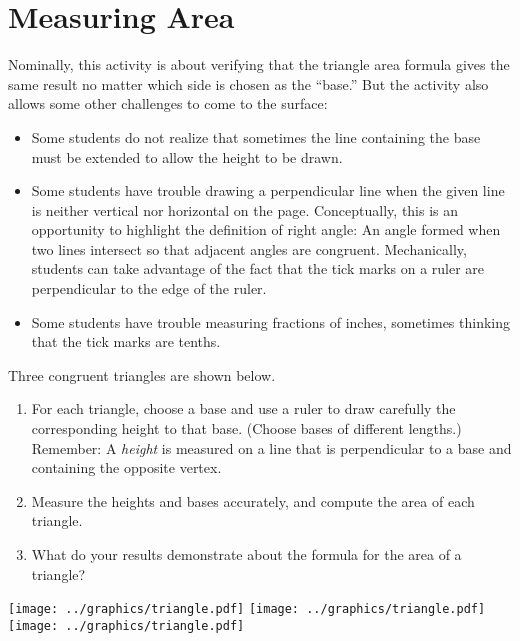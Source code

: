 \newpage

\section{Measuring Area}

\begin{teachingnote}
Nominally, this activity is about verifying that the triangle area formula gives the same result no matter which
side is chosen as the ``base.''  But the activity also allows some other challenges to come to the surface:  
\begin{itemize}
\item Some students do not realize that sometimes the line containing the base must be 
extended to allow the height to be drawn. 
\item Some students have trouble drawing a perpendicular line when the given line is neither vertical nor 
horizontal on the page.  Conceptually, this is an opportunity to highlight the definition of right angle:  An angle formed when two lines intersect so that adjacent angles are congruent.  Mechanically, students can take advantage of the fact that the tick marks on 
a ruler are perpendicular to the edge of the ruler.  
\item Some students have trouble measuring fractions of inches, sometimes thinking that the tick marks are tenths.  
\end{itemize}
\end{teachingnote}

\begin{prob}
Three congruent triangles are shown below.   
\begin{enumerate}
\item For each triangle, choose a base and use a ruler to draw carefully the corresponding height to that base.  (Choose bases of different lengths.)  Remember:  A \emph{height} is measured on a line that is perpendicular to a base and containing the opposite vertex. 
\item Measure the heights and bases accurately, and compute the area of each triangle.  
\item What do your results demonstrate about the formula for the area of a triangle?  
\end{enumerate}

\vfill
\begin{fullwidth}
\texttt{[image: ../graphics/triangle.pdf]}
\texttt{[image: ../graphics/triangle.pdf]}
\texttt{[image: ../graphics/triangle.pdf]}
\end{fullwidth}

\end{prob}
\vfill
